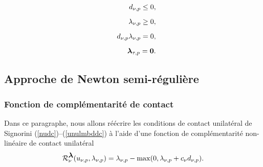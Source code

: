\begin{eqnarray}
&&\label{nudc}d_{\nu,p}\le 0,\\[2mm]
&&\label{lmbnudc}\lambda_{\nu, p}\ge 0,\\[2mm]
&&\label{unulmbddc}d_{\nu,p}\lambda_{\nu, p}= 0,\\[2mm]
&&\label{lmbddf} \mbox{\boldmath{$\lambda$}}_{\tau, p}= \mbox{\boldmath{$0$}}.
\end{eqnarray}

\subsection{Approche de Newton semi-régulière}\label{Activeset_type}

\subsubsection{Fonction de complémentarité de contact}\label{comp_cont}

\noindent Dans ce paragraphe, nous allons réécrire les conditions de contact unilatéral de Signorini (\ref{nudc})--(\ref{unulmbddc}) à l'aide d'une fonction de complémentarité non-linéaire de contact unilatéral 
\begin{align}\label{phi1c}
{\cal R}_{\nu}^{\mbox{\boldmath{$\lambda$}}}(u_{\nu, p},\lambda_{\nu, p})=\lambda_{\nu, p}-\max(0,\lambda_{\nu, p}+c_{\nu}d_{\nu,p}).
\end{align}

